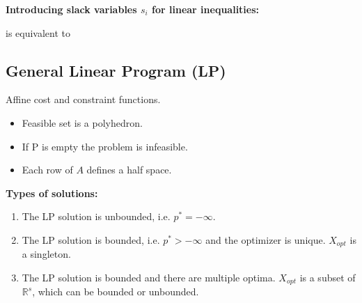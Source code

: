 \documentclass[8pt,a4paper]{scrartcl}
\begin{document}
\begin{multicols*}{3}
\textbf{Introducing slack variables $s_i$ for linear inequalities:}


is equivalent to 


\subsection{General Linear Program (LP)}

Affine cost and constraint functions.


\begin{itemize}
\ncompaq
\item Feasible set is a polyhedron.
\item If P is empty the problem is infeasible.
\item Each row of $A$ defines a half space.
\end{itemize}


\textbf{Types of solutions:}

\begin{enumerate}
\ncompaq
\item The LP solution is unbounded, i.e. $p^\ast =-\infty$.
\item The LP solution is bounded, i.e. $p^\ast > -\infty$ and the optimizer is unique. $X_{opt}$ is a singleton.
\item The LP solution is bounded and there are multiple optima. $X_{opt}$ is a subset of $\mathbb{R}^s$, which can be bounded or unbounded.
\end{enumerate}


\end{multicols*}
\end{document}
